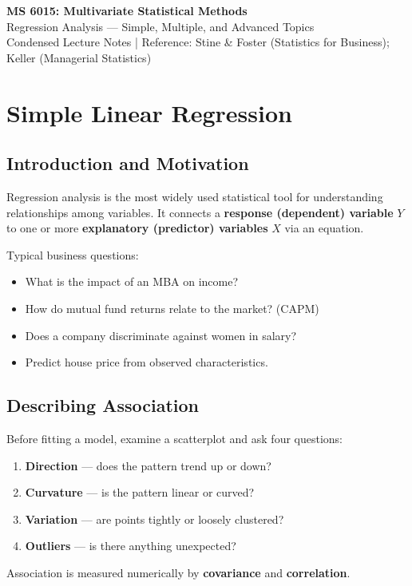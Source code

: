 \documentclass[12pt, a4paper]{article}
\begin{document}

\begin{center}
  {\LARGE\bfseries\color{sectionblue} MS 6015: Multivariate Statistical Methods}\\[6pt]
  {\large Regression Analysis — Simple, Multiple, and Advanced Topics}\\[4pt]
  {\normalsize Condensed Lecture Notes \quad|\quad
   Reference: Stine \& Foster (Statistics for Business); Keller (Managerial Statistics)}
\end{center}

\tableofcontents
\newpage

\section{Simple Linear Regression}

\subsection{Introduction and Motivation}

Regression analysis is the most widely used statistical tool for understanding relationships among variables. It connects a \textbf{response (dependent) variable} $Y$ to one or more \textbf{explanatory (predictor) variables} $X$ via an equation.

Typical business questions:
\begin{itemize}
  \item What is the impact of an MBA on income?
  \item How do mutual fund returns relate to the market? (CAPM)
  \item Does a company discriminate against women in salary?
  \item Predict house price from observed characteristics.
\end{itemize}

\subsection{Describing Association}

Before fitting a model, examine a scatterplot and ask four questions:
\begin{enumerate}
  \item \textbf{Direction} — does the pattern trend up or down?
  \item \textbf{Curvature} — is the pattern linear or curved?
  \item \textbf{Variation} — are points tightly or loosely clustered?
  \item \textbf{Outliers} — is there anything unexpected?
\end{enumerate}
Association is measured numerically by \textbf{covariance} and \textbf{correlation}.
\end{document}
